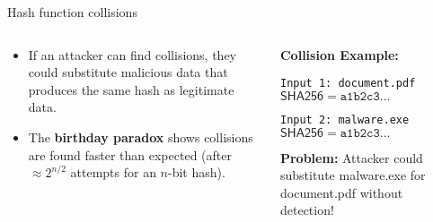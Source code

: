 \documentclass[aspectratio=169, lualatex, handout]{beamer}
\begin{document}
\begin{frame}{Hash function collisions}
	\begin{columns}[c]
		\begin{column}{0.55\textwidth}
			\begin{itemize}[<+->]
				\item If an attacker can find collisions, they could substitute malicious data
				      that produces the same hash as legitimate data.
				\item The \textbf{birthday paradox} shows collisions are found faster than
				      expected (after $\approx 2^{n/2}$ attempts for an $n$-bit hash).
			\end{itemize}
		\end{column}
		\begin{column}{0.45\textwidth}
			\begin{tcolorbox}[colback=black!5!white,colframe=ciphergray]
				\textbf{Collision Example:}

				\vspace{0.2cm}

				\texttt{Input 1: document.pdf}\\
				$\mathsf{SHA256} = \texttt{a1b2c3...}$

				\vspace{0.2cm}

				\texttt{Input 2: malware.exe}\\
				$\mathsf{SHA256} = \texttt{a1b2c3...}$

				\vspace{0.2cm}

				\textcolor{cipherprimary}{\textbf{Problem:} \small Attacker could substitute malware.exe for document.pdf without detection!}
			\end{tcolorbox}
		\end{column}
	\end{columns}
\end{frame}
\end{document}
